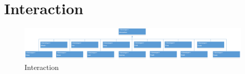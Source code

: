 \section{Interaction}
\begin{figure}
    \begin{center}
    \includegraphics[width=20cm]{10_img/Z_annexeA/interaction.PNG} 
    \caption{Interaction}
    \label{A-Interaction}
    \end{center}
\end{figure}
